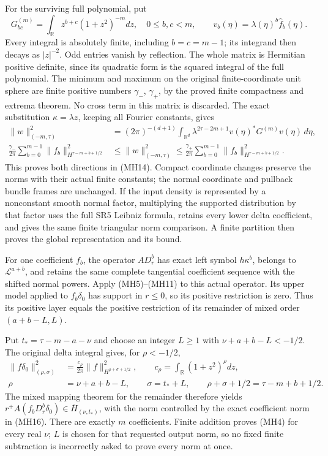 \documentclass[
  11pt,
]{article}
\begin{document}
For the surviving full polynomial, put \[
 G^{(m)}_{bc}=\int_{\mathbb R}z^{b+c}(1+z^2)^{-m}dz,
 \quad0\leq b,c<m,
 \qquad v_b(\eta)=\lambda(\eta)^b\widehat f_b(\eta).
 \tag{MH15}
\] Every integral is absolutely finite, including \(b=c=m-1\); its
integrand then decays as \(|z|^{-2}\). Odd entries vanish by reflection.
The whole matrix is Hermitian positive definite, since its quadratic
form is the squared integral of the full polynomial. The minimum and
maximum on the original finite-coordinate unit sphere are finite
positive numbers \(\gamma_-\), \(\gamma_+\), by the proved finite
compactness and extrema theorem. No cross term in this matrix is
discarded. The exact substitution \(\kappa=\lambda z\), keeping all
Fourier constants, gives \[
 \begin{split}
 \|w\|_{(-m,\tau)}^2
 &=(2\pi)^{-(d+1)}\int_{\mathbb R^d}
       \lambda^{2\tau-2m+1}v(\eta)^*G^{(m)}v(\eta)\,d\eta,\\
 \frac{\gamma_-}{2\pi}\sum_{b=0}^{m-1}
       \|f_b\|_{H^{\tau-m+b+1/2}}^2
 &\leq\|w\|_{(-m,\tau)}^2
 \leq\frac{\gamma_+}{2\pi}\sum_{b=0}^{m-1}
       \|f_b\|_{H^{\tau-m+b+1/2}}^2.
 \end{split}
 \tag{MH16}
\] This proves both directions in (MH14). Compact coordinate changes
preserve the norms with their actual finite constants; the normal
coordinate and pullback bundle frames are unchanged. If the input
density is represented by a nonconstant smooth normal factor,
multiplying the supported distribution by that factor uses the full SR5
Leibniz formula, retains every lower delta coefficient, and gives the
same finite triangular norm comparison. A finite partition then proves
the global representation and its bound.

For one coefficient \(f_b\), the operator \(A D_r^b\) has exact left
symbol \(h\kappa^b\), belongs to \(\mathcal L^{a+b}\), and retains the
same complete tangential coefficient sequence with the shifted normal
powers. Apply (MH5)--(MH11) to this actual operator. Its upper model
applied to \(f_b\delta_0\) has support in \(r\leq0\), so its positive
restriction is zero. Thus its positive layer equals the positive
restriction of its remainder of mixed order \((a+b-L,L)\).

Put \(t_* =\tau-m-a-\nu\) and choose an integer \(L\geq1\) with
\(\nu+a+b-L<-1/2\). The original delta integral gives, for
\(\rho< -1/2\), \[
 \begin{split}
 \|f\delta_0\|_{(\rho,\sigma)}^2
 &=\frac{c_\rho}{2\pi}
          \|f\|_{H^{\rho+\sigma+1/2}}^2,
 \qquad c_\rho=\int_{\mathbb R}(1+z^2)^\rho dz,\\
 \rho&=\nu+a+b-L,
 \qquad\sigma=t_*+L,
 \qquad\rho+\sigma+1/2=\tau-m+b+1/2.
 \end{split}
 \tag{MH17}
\] The mixed mapping theorem for the remainder therefore yields
\(r^+A(f_bD_r^b\delta_0)\in\overline H_{(\nu,t_*)}\), with the norm
controlled by the exact coefficient norm in (MH16). There are exactly
\(m\) coefficients. Finite addition proves (MH4) for every real \(\nu\);
\(L\) is chosen for that requested output norm, so no fixed finite
subtraction is incorrectly asked to prove every norm at once.
\end{document}
